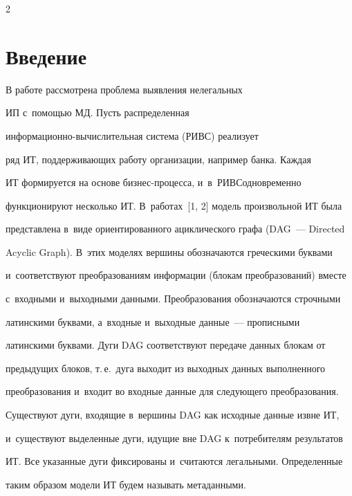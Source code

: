 \begin{multicols}{2}





\label{st\stat}


  


\section{Введение}





  В работе рассмотрена проблема выявления нелегальных


ИП с~по\-мощью МД. Пусть распределенная 


ин\-фор\-ма\-ци\-он\-но-вы\-чис\-ли\-тель\-ная сис\-те\-ма (РИВС) реализует 


ряд ИТ, поддерживающих работу организации, например банка. Каждая 


ИТ формируется на основе биз\-нес-про\-цес\-са, и~в~\mbox{РИВС}\linebreak одновременно 


функционируют несколько ИТ. В~работах~[1, 2] модель произвольной ИТ была 


представлена в~виде ориентированного ациклического графа (DAG~--- Directed 


Acyclic Graph). В~этих моделях вершины обозначаются греческими буквами 


и~соответствуют преобразованиям информации (блокам преобразований) вместе 


с~входными и~выходными данными. Преобразования обозначаются строчными 


латинскими буквами, а~входные и~выходные данные~--- прописными 


латинскими буквами. Дуги DAG соответствуют передаче данных блокам от 


предыдущих блоков, т.\,е.\ дуга выходит из выходных данных выполненного 


преобразования и~входит во входные данные для сле\-ду\-юще\-го преобразования. 


Существуют дуги, входящие в~вершины DAG как исходные данные извне ИТ, 


и~существуют выделенные дуги, идущие вне DAG к~потребителям результатов 


ИТ. Все указанные дуги фиксированы и~считаются легальными. Определенные 


таким образом модели ИТ будем называть метаданными.



\end{multicols}
